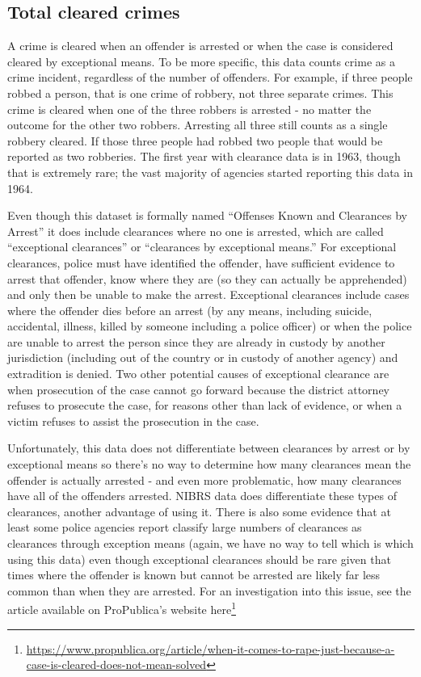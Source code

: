 \documentclass[
]{krantz}
\renewcommand{\href}[2]{#2\footnote{\url{#1}}}
\begin{document}
\subsection{Total cleared crimes}\label{clearedCrimes}

A crime is cleared when an offender is arrested or when the
case is considered cleared by exceptional means. To be more
specific, this data counts crime as a crime incident,
regardless of the number of offenders. For example, if three
people robbed a person, that is one crime of robbery, not
three separate crimes. This crime is cleared when one of the
three robbers is arrested - no matter the outcome for the
other two robbers. Arresting all three still counts as a
single robbery cleared. If those three people had robbed two
people that would be reported as two robberies. The first
year with clearance data is in 1963, though that is
extremely rare; the vast majority of agencies started
reporting this data in 1964.

Even though this dataset is formally named ``Offenses Known
and Clearances by Arrest'' it does include clearances where
no one is arrested, which are called ``exceptional
clearances'' or ``clearances by exceptional means.'' For
exceptional clearances, police must have identified the
offender, have sufficient evidence to arrest that offender,
know where they are (so they can actually be apprehended)
and only then be unable to make the arrest. Exceptional
clearances include cases where the offender dies before an
arrest (by any means, including suicide, accidental,
illness, killed by someone including a police officer) or
when the police are unable to arrest the person since they
are already in custody by another jurisdiction (including
out of the country or in custody of another agency) and
extradition is denied. Two other potential causes of
exceptional clearance are when prosecution of the case
cannot go forward because the district attorney refuses to
prosecute the case, for reasons other than lack of evidence,
or when a victim refuses to assist the prosecution in the
case.

Unfortunately, this data does not differentiate between
clearances by arrest or by exceptional means so there's no
way to determine how many clearances mean the offender is
actually arrested - and even more problematic, how many
clearances have all of the offenders arrested. NIBRS data
does differentiate these types of clearances, another
advantage of using it. There is also some evidence that at
least some police agencies report classify large numbers of
clearances as clearances through exception means (again, we
have no way to tell which is which using this data) even
though exceptional clearances should be rare given that
times where the offender is known but cannot be arrested are
likely far less common than when they are arrested. For an
investigation into this issue, see the
\citet{yeung2018comes} article available on ProPublica's
website
\href{https://www.propublica.org/article/when-it-comes-to-rape-just-because-a-case-is-cleared-does-not-mean-solved}{here}
\end{document}
